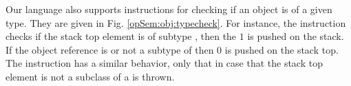 Our language also supports instructions for checking if an object is of a given type. They are given in Fig. \ref{opSem:obj:typecheck}.
For instance, the instruction \instanceof{} checks if the stack top element is 
 of subtype \clazz{}, then the   $1$ is pushed on the stack. If 
the object reference is \Mynull or not a subtype of \clazz{} then $0$ is pushed on the stack top. 
The \checkcast{} instruction has a similar behavior, only that in case that the stack top element is not
a subclass of \clazz{} a \ClassCastExc{} is thrown.

\begin{figure}[ht!] 
\end{figure}
